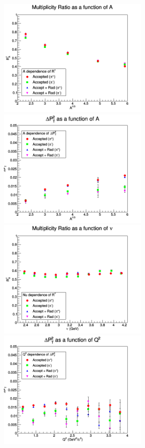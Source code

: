 \begin{figure}[p]
\centering
\includegraphics[width=7.4cm] {new-fig/60_Adep_Ratio_A13_3.png} 
\includegraphics[width=7.4cm] {new-fig/64_Adep_DePts_A13_3.png} 
\includegraphics[width=7.4cm] {new-fig/61_Ndep_Ratio_Nu_3.png} 
\includegraphics[width=7.4cm] {new-fig/66_Qdep_DePts_Q2_3.png} 

\end{figure}
